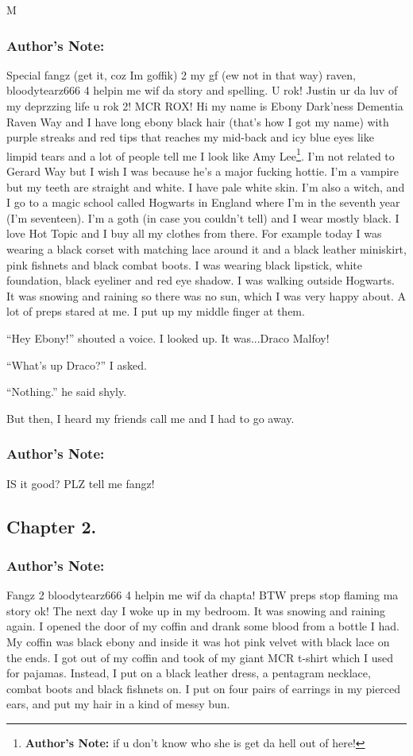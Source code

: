 M\documentclass{article}
\begin{document}
\subsubsection*{Author's Note:} Special fangz (get it, coz Im goffik) 2 my gf (ew not in that way) raven, bloodytearz666 4 helpin me wif da story and spelling. U rok! Justin ur da luv of my deprzzing life u rok 2! MCR ROX!
\textbreak
\linenumbers\resetlinenumber
Hi my name is Ebony Dark’ness Dementia Raven Way and I have long ebony black hair (that’s how I got my name) with purple streaks and red tips that reaches my mid-back and icy blue eyes like limpid tears and a lot of people tell me I look like Amy Lee\footnote{\textbf{Author's Note: }if u don’t know who she is get da hell out of here!}. I’m not related to Gerard Way but I wish I was because he’s a major fucking hottie. I’m a vampire but my teeth are straight and white. I have pale white skin. I’m also a witch, and I go to a magic school called Hogwarts in England where I’m in the seventh year (I’m seventeen). I’m a goth (in case you couldn’t tell) and I wear mostly black. I love Hot Topic and I buy all my clothes from there. For example today I was wearing a black corset with matching lace around it and a black leather miniskirt, pink fishnets and black combat boots. I was wearing black lipstick, white foundation, black eyeliner and red eye shadow. I was walking outside Hogwarts. It was snowing and raining so there was no sun, which I was very happy about. A lot of preps stared at me. I put up my middle finger at them.

“Hey Ebony!” shouted a voice. I looked up. It was...Draco Malfoy!

“What’s up Draco?” I asked.

“Nothing.” he said shyly.

But then, I heard my friends call me and I had to go away.
\nolinenumbers
\textbreak
\subsubsection*{Author's Note:} IS it good? PLZ tell me fangz!

\clearpage
\nolinenumbers
\subsection*{Chapter 2.}

\subsubsection*{Author's Note:} Fangz 2 bloodytearz666 4 helpin me wif da chapta! BTW preps stop flaming ma story ok!
\textbreak
\linenumbers\resetlinenumber
\linenumbers\resetlinenumber
The next day I woke up in my bedroom. It was snowing and raining again. I opened the door of my coffin and drank some blood from a bottle I had. My coffin was black ebony and inside it was hot pink velvet with black lace on the ends. I got out of my coffin and took of my giant MCR t-shirt which I used for pajamas. Instead, I put on a black leather dress, a pentagram necklace, combat boots and black fishnets on. I put on four pairs of earrings in my pierced ears, and put my hair in a kind of messy bun.
\end{document}
